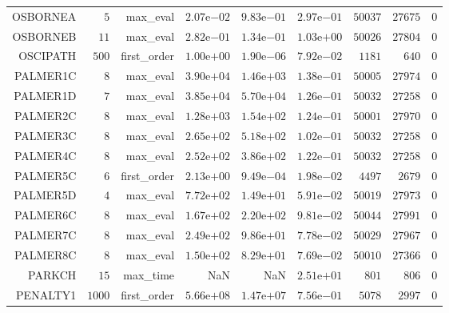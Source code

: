 \begin{longtable}{rrrrrrrrr}
OSBORNEA & \(     5\) & max\_eval & \( 2.07\)e\(-02\) & \( 9.83\)e\(-01\) & \( 2.97\)e\(-01\) & \( 50037\) & \( 27675\) & \(     0\) \\
OSBORNEB & \(    11\) & max\_eval & \( 2.82\)e\(-01\) & \( 1.34\)e\(-01\) & \( 1.03\)e\(+00\) & \( 50026\) & \( 27804\) & \(     0\) \\
OSCIPATH & \(   500\) & first\_order & \( 1.00\)e\(+00\) & \( 1.90\)e\(-06\) & \( 7.92\)e\(-02\) & \(  1181\) & \(   640\) & \(     0\) \\
PALMER1C & \(     8\) & max\_eval & \( 3.90\)e\(+04\) & \( 1.46\)e\(+03\) & \( 1.38\)e\(-01\) & \( 50005\) & \( 27974\) & \(     0\) \\
PALMER1D & \(     7\) & max\_eval & \( 3.85\)e\(+04\) & \( 5.70\)e\(+04\) & \( 1.26\)e\(-01\) & \( 50032\) & \( 27258\) & \(     0\) \\
PALMER2C & \(     8\) & max\_eval & \( 1.28\)e\(+03\) & \( 1.54\)e\(+02\) & \( 1.24\)e\(-01\) & \( 50001\) & \( 27970\) & \(     0\) \\
PALMER3C & \(     8\) & max\_eval & \( 2.65\)e\(+02\) & \( 5.18\)e\(+02\) & \( 1.02\)e\(-01\) & \( 50032\) & \( 27258\) & \(     0\) \\
PALMER4C & \(     8\) & max\_eval & \( 2.52\)e\(+02\) & \( 3.86\)e\(+02\) & \( 1.22\)e\(-01\) & \( 50032\) & \( 27258\) & \(     0\) \\
PALMER5C & \(     6\) & first\_order & \( 2.13\)e\(+00\) & \( 9.49\)e\(-04\) & \( 1.98\)e\(-02\) & \(  4497\) & \(  2679\) & \(     0\) \\
PALMER5D & \(     4\) & max\_eval & \( 7.72\)e\(+02\) & \( 1.49\)e\(+01\) & \( 5.91\)e\(-02\) & \( 50019\) & \( 27973\) & \(     0\) \\
PALMER6C & \(     8\) & max\_eval & \( 1.67\)e\(+02\) & \( 2.20\)e\(+02\) & \( 9.81\)e\(-02\) & \( 50044\) & \( 27991\) & \(     0\) \\
PALMER7C & \(     8\) & max\_eval & \( 2.49\)e\(+02\) & \( 9.86\)e\(+01\) & \( 7.78\)e\(-02\) & \( 50029\) & \( 27967\) & \(     0\) \\
PALMER8C & \(     8\) & max\_eval & \( 1.50\)e\(+02\) & \( 8.29\)e\(+01\) & \( 7.69\)e\(-02\) & \( 50010\) & \( 27366\) & \(     0\) \\
PARKCH & \(    15\) & max\_time &       NaN &       NaN & \( 2.51\)e\(+01\) & \(   801\) & \(   806\) & \(     0\) \\
PENALTY1 & \(  1000\) & first\_order & \( 5.66\)e\(+08\) & \( 1.47\)e\(+07\) & \( 7.56\)e\(-01\) & \(  5078\) & \(  2997\) & \(     0\) \\

\end{longtable}
